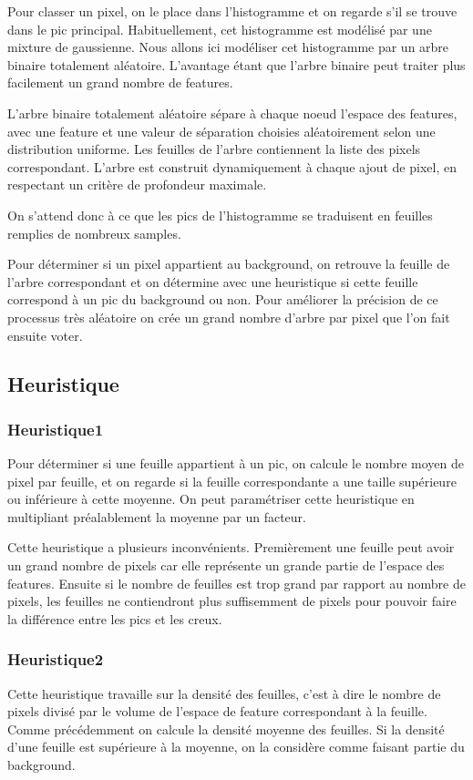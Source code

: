 \documentclass[11pt,a4paper]{report}
\begin{document}
	Pour classer un pixel, on le place dans l'histogramme et on regarde s'il se trouve dans le pic principal. 
	Habituellement, cet histogramme est modélisé par une mixture de gaussienne. Nous allons ici modéliser cet
	histogramme par un arbre binaire totalement aléatoire. L'avantage étant que l'arbre binaire peut traiter
	plus facilement un grand nombre de features.

	L'arbre binaire totalement aléatoire sépare à chaque noeud l'espace des features, avec une feature et une
	valeur de séparation choisies aléatoirement selon une distribution uniforme. Les feuilles de l'arbre 
	contiennent la liste des pixels correspondant. L'arbre est construit dynamiquement à chaque ajout de pixel,
	en respectant un critère de profondeur maximale.

	On s'attend donc à ce que les pics de l'histogramme se traduisent en feuilles remplies de nombreux samples.

	Pour déterminer si un pixel appartient au background, on retrouve la feuille de l'arbre correspondant et on
	détermine avec une heuristique si cette feuille correspond à un pic du background ou non. Pour améliorer
	la précision de ce processus très aléatoire on crée un grand nombre d'arbre par pixel que l'on fait ensuite
	voter.

	\subsection{Heuristique}
		\subsubsection{Heuristique1}
			Pour déterminer si une feuille appartient à un pic, on calcule le nombre moyen de pixel par
			feuille, et on regarde si la feuille correspondante a une taille supérieure ou inférieure
			à cette moyenne. On peut paramétriser cette heuristique en multipliant préalablement la moyenne
			par un facteur.

			Cette heuristique a plusieurs inconvénients. Premièrement une feuille peut avoir un grand nombre
			de pixels car elle représente un grande partie de l'espace des features. Ensuite si le nombre de
			feuilles est trop grand par rapport au nombre de pixels, les feuilles ne contiendront plus suffisemment
			de pixels pour pouvoir faire la différence entre les pics et les creux.
		\subsubsection{Heuristique2}
			Cette heuristique travaille sur la densité des feuilles, c'est à dire le nombre de pixels divisé par le
			volume de l'espace de feature correspondant à la feuille.  Comme précédemment on calcule la densité 
			moyenne des feuilles. Si la densité d'une feuille est supérieure à la moyenne, on la considère comme faisant
			partie du background.
\end{document}

